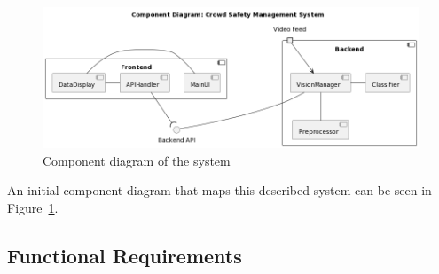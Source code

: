 \documentclass[
]{article}
\begin{document}
\begin{figure}

{\centering \includegraphics[width=\textwidth,height=0.5\textheight]{../images/component-diagram-1.png}

}

\caption{\label{fig-component-diagram}Component diagram of the system}

\end{figure}

An initial component diagram that maps this described system can be seen
in Figure~\ref{fig-component-diagram}.

\hypertarget{functional-requirements}{%
\subsection{Functional Requirements}\label{functional-requirements}}
\end{document}
